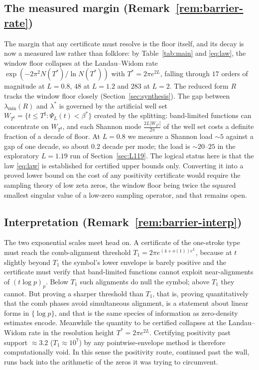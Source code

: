 ﻿\documentclass[11pt]{article}
\newcommand{\lmin}{\lambda^{*}}
\newcommand{\lammin}{\lambda_{\min}}
\newcommand{\Tstar}{T^{*}}
\newcommand{\Tsharp}{T^{\sharp}}
\begin{document}
\subsection{The measured margin (Remark~\ref{rem:barrier-rate})}
The margin that any certificate must resolve is the floor itself, and
its decay is now a measured law rather than folklore: by
Table~\ref{tab:main} and \eqref{eq:law}, the window floor collapses at
the Landau--Widom rate $\exp(-2\pi^2N(\Tstar)/\ln N(\Tstar))$ with
$\Tstar=2\pi e^{2L}$, falling through $17$ orders of magnitude at
$L=0.8$, $48$ at $L=1.2$ and $283$ at $L=2$.  The reduced form $R$
tracks the window floor closely (Section~\ref{sec:synthesis}).  The gap
between $\lammin(R)$ and $\lmin$ is governed by the artificial well set
$W_{\Tsharp}=\{t\le\Tsharp:\Psi_L(t)<\beta^*\}$ created by the
splitting: band-limited functions can concentrate on $W_{\Tsharp}$, and
each Shannon mode $\frac{2L|W_{\Tsharp}|}{2\pi}$ of the well set costs
a definite fraction of a decade of floor.  At $L=0.8$ we measure a
Shannon load $\sim5$ against a gap of one decade, so about $0.2$ decade
per mode; the load is $\sim20$--$25$ in the exploratory $L=1.19$ run of
Section~\ref{sec:L119}.  The logical status here is that the law
\eqref{eq:law} is established for certified upper bounds only.
Converting it into a proved lower bound on the cost of any positivity
certificate would require the sampling theory of low zeta zeros, the
window floor being twice the squared smallest singular value of a
low-zero sampling operator, and that remains open.

\subsection{Interpretation (Remark~\ref{rem:barrier-interp})}
The two exponential scales meet head on.  A certificate of the
one-stroke type must reach the comb-alignment threshold
$T_1=2\pi e^{(4+o(1))e^L}$, because at $t$ slightly beyond $T_1$ the
symbol's lower envelope is barely positive and the certificate must
verify that band-limited functions cannot exploit near-alignments of
$(t\log p)_p$.  Below $T_1$ such alignments do null the symbol; above
$T_1$ they cannot.  But proving a sharper threshold than $T_1$, that
is, proving quantitatively that the comb phases avoid simultaneous
alignment, is a statement about linear forms in $\{\log p\}$, and that
is the same species of information as zero-density estimates encode.
Meanwhile the quantity to be certified collapses at the Landau--Widom
rate in the resolution height $\Tstar=2\pi e^{2L}$.  Certifying
positivity past support $\approx3.2$ ($T_1\approx10^7$) by any
pointwise-envelope method is therefore computationally void.  In this
sense the positivity route, continued past the wall, runs back into the
arithmetic of the zeros it was trying to circumvent.
\end{document}
